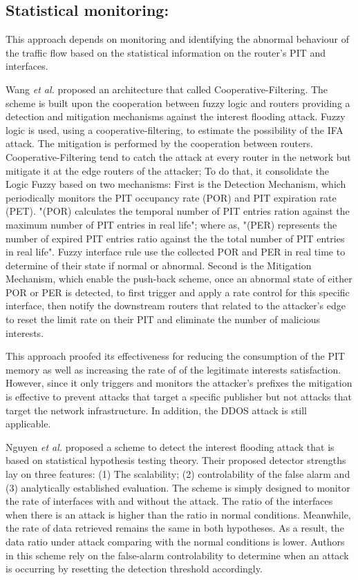 \documentclass[conference]{IEEEtran}
\begin{document}
\subsection{Statistical monitoring:}

This approach depends on monitoring and identifying the abnormal behaviour of the traffic flow based on the statistical information on the router's PIT and interfaces. 

Wang \textit{et al.} \cite{Wang2014} proposed an architecture that called Cooperative-Filtering. The scheme is built upon the cooperation between fuzzy logic and routers providing a detection and mitigation mechanisms against the interest flooding attack. Fuzzy logic is used, using a cooperative-filtering, to estimate the possibility of the IFA attack. The mitigation is performed by the cooperation between routers. Cooperative-Filtering tend to catch the attack at every router in the network but mitigate it at the edge routers of the attacker; To do that, it consolidate the Logic Fuzzy based on two mechanisms: First is the Detection Mechanism, which periodically monitors the PIT occupancy rate (POR) and  PIT expiration rate (PET). "(POR) calculates the temporal number of PIT entries ration against the maximum number of PIT entries in real life"; where as, "(PER) represents the number of expired PIT entries ratio against the the total number of PIT entries in real life". Fuzzy interface rule use the collected POR and PER in real time to determine of their state if normal or abnormal. Second is the Mitigation Mechanism, which enable the push-back scheme, once an abnormal state of either POR or PER is detected, to first trigger and apply a rate control for this specific interface, then notify the downstream routers that related to the attacker's edge to reset the limit rate on their PIT and eliminate the number of malicious interests.

This approach proofed its effectiveness for reducing the consumption of the PIT memory as well as increasing the rate of of the legitimate interests satisfaction. However, since it only triggers and monitors the attacker's prefixes the mitigation is effective to prevent attacks that target a specific publisher but not attacks that target the network infrastructure. In addition, the DDOS attack is still applicable.    

Nguyen \textit{et al.} \cite{Nguyen2015} proposed a scheme to detect the interest flooding attack that is based on statistical hypothesis testing theory. Their proposed detector strengths lay on three features: (1) The scalability; (2) controlability of the false alarm and (3) analytically established evaluation. The scheme is simply designed to monitor the rate of interfaces with and without the attack. The ratio of the interfaces when there is an attack is higher than the ratio in normal conditions. Meanwhile, the rate of data retrieved remains the same in both hypotheses. As a result, the data ratio under attack comparing with the normal conditions is lower. Authors in this scheme rely on the false-alarm controlability to determine when an attack is occurring by resetting the detection threshold accordingly.   
\end{document}
